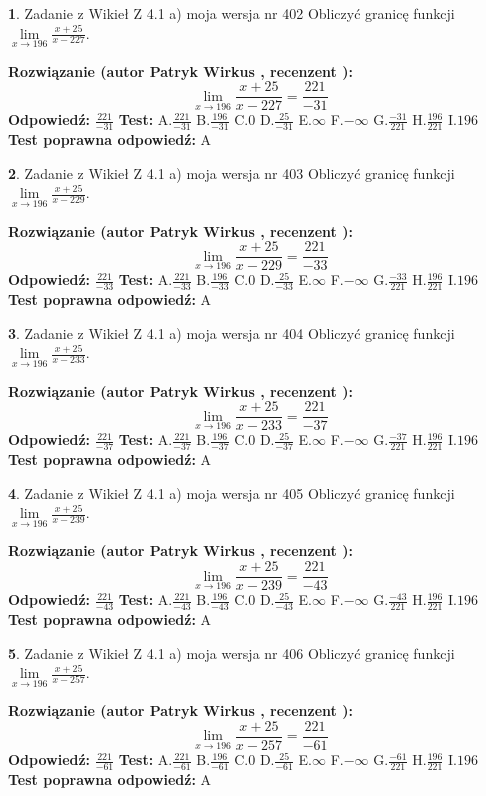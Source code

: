 \documentclass[12pt, a4paper]{article}
\theoremstyle{definition} %
\newtheorem{zad}{}
\newcommand{\zadStart}[1]{\begin{zad}#1\newline}
\newcommand{\zadStop}{\end{zad}}
\newcommand{\rozwStart}[2]{\noindent \textbf{Rozwiązanie (autor #1 , recenzent #2): }\newline}
\newcommand{\rozwStop}{\newline}
\newcommand{\odpStart}{\noindent \textbf{Odpowiedź:}\newline}
\newcommand{\odpStop}{\newline}
\newcommand{\testStart}{\noindent \textbf{Test:}\newline}
\newcommand{\testStop}{\newline}
\newcommand{\kluczStart}{\noindent \textbf{Test poprawna odpowiedź:}\newline}
\newcommand{\kluczStop}{\newline}
\begin{document}
\zadStart{Zadanie z Wikieł Z 4.1 a) moja wersja nr 402}
Obliczyć granicę funkcji $\lim\limits_{x\to196}\frac{x+25}{x-227}$.
\zadStop
\rozwStart{Patryk Wirkus}{}
$$\lim\limits_{x\to196}\frac{x+25}{x-227} = \frac{221}{-31}$$
\rozwStop
\odpStart
$\frac{221}{-31}$
\odpStop
\testStart
A.$\frac{221}{-31}$
B.$\frac{196}{-31}$
C.$0$
D.$\frac{25}{-31}$
E.$\infty$
F.$-\infty$
G.$\frac{-31}{221}$
H.$\frac{196}{221}$
I.$196$
\testStop
\kluczStart
A
\kluczStop



\zadStart{Zadanie z Wikieł Z 4.1 a) moja wersja nr 403}
Obliczyć granicę funkcji $\lim\limits_{x\to196}\frac{x+25}{x-229}$.
\zadStop
\rozwStart{Patryk Wirkus}{}
$$\lim\limits_{x\to196}\frac{x+25}{x-229} = \frac{221}{-33}$$
\rozwStop
\odpStart
$\frac{221}{-33}$
\odpStop
\testStart
A.$\frac{221}{-33}$
B.$\frac{196}{-33}$
C.$0$
D.$\frac{25}{-33}$
E.$\infty$
F.$-\infty$
G.$\frac{-33}{221}$
H.$\frac{196}{221}$
I.$196$
\testStop
\kluczStart
A
\kluczStop



\zadStart{Zadanie z Wikieł Z 4.1 a) moja wersja nr 404}
Obliczyć granicę funkcji $\lim\limits_{x\to196}\frac{x+25}{x-233}$.
\zadStop
\rozwStart{Patryk Wirkus}{}
$$\lim\limits_{x\to196}\frac{x+25}{x-233} = \frac{221}{-37}$$
\rozwStop
\odpStart
$\frac{221}{-37}$
\odpStop
\testStart
A.$\frac{221}{-37}$
B.$\frac{196}{-37}$
C.$0$
D.$\frac{25}{-37}$
E.$\infty$
F.$-\infty$
G.$\frac{-37}{221}$
H.$\frac{196}{221}$
I.$196$
\testStop
\kluczStart
A
\kluczStop



\zadStart{Zadanie z Wikieł Z 4.1 a) moja wersja nr 405}
Obliczyć granicę funkcji $\lim\limits_{x\to196}\frac{x+25}{x-239}$.
\zadStop
\rozwStart{Patryk Wirkus}{}
$$\lim\limits_{x\to196}\frac{x+25}{x-239} = \frac{221}{-43}$$
\rozwStop
\odpStart
$\frac{221}{-43}$
\odpStop
\testStart
A.$\frac{221}{-43}$
B.$\frac{196}{-43}$
C.$0$
D.$\frac{25}{-43}$
E.$\infty$
F.$-\infty$
G.$\frac{-43}{221}$
H.$\frac{196}{221}$
I.$196$
\testStop
\kluczStart
A
\kluczStop



\zadStart{Zadanie z Wikieł Z 4.1 a) moja wersja nr 406}
Obliczyć granicę funkcji $\lim\limits_{x\to196}\frac{x+25}{x-257}$.
\zadStop
\rozwStart{Patryk Wirkus}{}
$$\lim\limits_{x\to196}\frac{x+25}{x-257} = \frac{221}{-61}$$
\rozwStop
\odpStart
$\frac{221}{-61}$
\odpStop
\testStart
A.$\frac{221}{-61}$
B.$\frac{196}{-61}$
C.$0$
D.$\frac{25}{-61}$
E.$\infty$
F.$-\infty$
G.$\frac{-61}{221}$
H.$\frac{196}{221}$
I.$196$
\testStop
\kluczStart
A
\kluczStop
\end{document}
